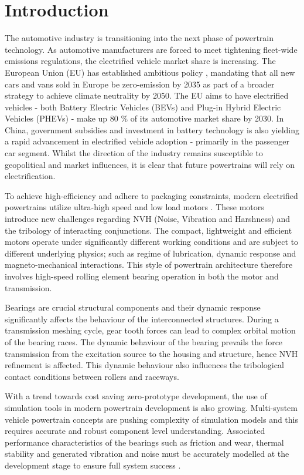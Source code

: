 \chapter{Introduction} \label{Introduction}

The automotive industry is transitioning into the next phase of powertrain technology. As automotive manufacturers are forced to meet tightening fleet-wide emissions regulations, the electrified vehicle market share is increasing. The European Union (EU) has established ambitious policy \cite{EUL110/5}, mandating that all new cars and vans sold in Europe be zero-emission by 2035 as part of a broader strategy to achieve climate neutrality by 2050. The EU aims to have electrified vehicles - both Battery Electric Vehicles (BEVs) and Plug-in Hybrid Electric Vehicles (PHEVs) - make up 80 \% of its automotive market share by 2030. In China, government subsidies and investment in battery technology is also yielding a rapid advancement in electrified vehicle adoption - primarily in the passenger car segment. Whilst the direction of the industry remains susceptible to geopolitical and market influences, it is clear that future powertrains will rely on electrification.

To achieve high-efficiency and adhere to packaging constraints, modern electrified powertrains utilize ultra-high speed and low load motors \cite{Cai2021}. These motors introduce new challenges regarding NVH (Noise, Vibration and Harshness) and the tribology of interacting conjunctions. The compact, lightweight and efficient motors operate under significantly different working conditions and are subject to different underlying physics; such as regime of lubrication, dynamic response and magneto-mechanical interactions. This style of powertrain architecture therefore involves high-speed rolling element bearing operation in both the motor and transmission.

Bearings are crucial structural components and their dynamic response significantly affects the behaviour of the interconnected structures. During a transmission meshing cycle, gear tooth forces can lead to complex orbital motion of the bearing races. The dynamic behaviour of the bearing prevails the force transmission from the excitation source to the housing and structure, hence NVH refinement is affected. This dynamic behaviour also influences the tribological contact conditions between rollers and raceways.

With a trend towards cost saving zero-prototype development, the use of simulation tools in modern powertrain development is also growing. Multi-system vehicle powertrain concepts are pushing complexity of simulation models and this requires accurate and robust component level understanding. Associated performance characteristics of the bearings such as friction and wear, thermal stability and generated vibration and noise must be accurately modelled at the development stage to ensure full system success \cite{Wensing1972a}.


